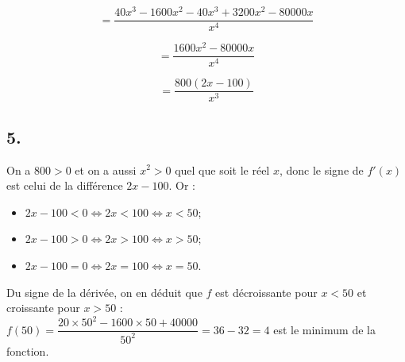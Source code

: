 	\[ = \dfrac{40x^3 - 1600x^2 - 40x^3 + 3200x^2 - 80000x}{x^4} \]
	
	\[ = \dfrac{1600x^2 - 80000x}{x^4} \]
	
	\[ = \dfrac{800(2x - 100)}{x^3} \]
	
	\subsection*{5.}
	
	
	On a \(800 > 0\) et on a aussi \(x^2 > 0\) quel que soit le réel \(x\), donc le signe de \(f'(x)\) est celui de la différence \(2x - 100\). Or :
	
	\begin{itemize}
		\item \(2x - 100 < 0 \iff 2x < 100 \iff x < 50\);
		\item \(2x - 100 > 0 \iff 2x > 100 \iff x > 50\);
		\item \(2x - 100 = 0 \iff 2x = 100 \iff x = 50\).
	\end{itemize}
	
	Du signe de la dérivée, on en déduit que \(f\) est décroissante pour \(x < 50\) et croissante pour \(x > 50\) :\\
	 \(f(50) = \dfrac{20 \times 50^2 - 1600 \times 50 + 40000}{50^2} = 36 - 32 = 4 \) est le minimum de la fonction.
